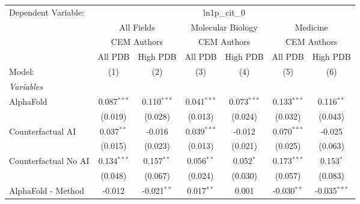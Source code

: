 \begingroup
\centering
\begin{tabular}{lcccccc}
   \tabularnewline \midrule \midrule
   Dependent Variable: & \multicolumn{6}{c}{ln1p\_cit\_0}\\
 & \multicolumn{2}{c}{All Fields} & \multicolumn{2}{c}{Molecular Biology} & \multicolumn{2}{c}{Medicine} \\
\cmidrule(lr){2-3} \cmidrule(lr){4-5} \cmidrule(lr){6-7}
 & \multicolumn{2}{c}{CEM Authors} & \multicolumn{2}{c}{CEM Authors} & \multicolumn{2}{c}{CEM Authors} \\
\cmidrule(lr){2-3} \cmidrule(lr){4-5} \cmidrule(lr){6-7}
 & \multicolumn{1}{c}{All PDB} & \multicolumn{1}{c}{High PDB} & \multicolumn{1}{c}{All PDB} & \multicolumn{1}{c}{High PDB} & \multicolumn{1}{c}{All PDB} & \multicolumn{1}{c}{High PDB} \\
\cmidrule(lr){2-2} \cmidrule(lr){3-3} \cmidrule(lr){4-4} \cmidrule(lr){5-5} \cmidrule(lr){6-6} \cmidrule(lr){7-7}
   Model:                                                     & (1)           & (2)           & (3)           & (4)           & (5)           & (6)\\  
   \midrule
   \emph{Variables}\\
   AlphaFold                                                  & 0.087$^{***}$ & 0.110$^{***}$ & 0.041$^{***}$ & 0.073$^{***}$ & 0.133$^{***}$ & 0.116$^{**}$\\   
                                                              & (0.019)       & (0.028)       & (0.013)       & (0.024)       & (0.032)       & (0.043)\\   
   Counterfactual AI                                          & 0.037$^{**}$  & -0.016        & 0.039$^{***}$ & -0.012        & 0.070$^{***}$ & -0.025\\   
                                                              & (0.015)       & (0.023)       & (0.013)       & (0.021)       & (0.025)       & (0.063)\\   
   Counterfactual No AI                                       & 0.134$^{***}$ & 0.157$^{**}$  & 0.056$^{**}$  & 0.052$^{*}$   & 0.173$^{***}$ & 0.153$^{*}$\\   
                                                              & (0.048)       & (0.067)       & (0.024)       & (0.030)       & (0.057)       & (0.083)\\   
   AlphaFold - Method                                         & -0.012        & -0.021$^{**}$ & 0.017$^{**}$  & 0.001         & -0.030$^{**}$ & -0.035$^{***}$\\   

\end{tabular}
